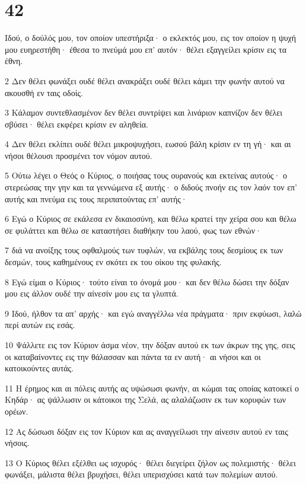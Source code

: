 \chapter{42}

\par Ιδού, ο δούλός μου, τον οποίον υπεστήριξα· ο εκλεκτός μου, εις τον οποίον η ψυχή μου ευηρεστήθη· έθεσα το πνεύμά μου επ' αυτόν· θέλει εξαγγείλει κρίσιν εις τα έθνη.
\par 2 Δεν θέλει φωνάξει ουδέ θέλει ανακράξει ουδέ θέλει κάμει την φωνήν αυτού να ακουσθή εν ταις οδοίς.
\par 3 Κάλαμον συντεθλασμένον δεν θέλει συντρίψει και λινάριον καπνίζον δεν θέλει σβύσει· θέλει εκφέρει κρίσιν εν αληθεία.
\par 4 Δεν θέλει εκλίπει ουδέ θέλει μικροψυχήσει, εωσού βάλη κρίσιν εν τη γή· και αι νήσοι θέλουσι προσμένει τον νόμον αυτού.
\par 5 Ούτω λέγει ο Θεός ο Κύριος, ο ποιήσας τους ουρανούς και εκτείνας αυτούς· ο στερεώσας την γην και τα γεννώμενα εξ αυτής· ο διδούς πνοήν εις τον λαόν τον επ' αυτής και πνεύμα εις τους περιπατούντας επ' αυτής·
\par 6 Εγώ ο Κύριος σε εκάλεσα εν δικαιοσύνη, και θέλω κρατεί την χείρα σου και θέλω σε φυλάττει και θέλω σε καταστήσει διαθήκην του λαού, φως των εθνών·
\par 7 διά να ανοίξης τους οφθαλμούς των τυφλών, να εκβάλης τους δεσμίους εκ των δεσμών, τους καθημένους εν σκότει εκ του οίκου της φυλακής.
\par 8 Εγώ είμαι ο Κύριος· τούτο είναι το όνομά μου· και δεν θέλω δώσει την δόξαν μου εις άλλον ουδέ την αίνεσίν μου εις τα γλυπτά.
\par 9 Ιδού, ήλθον τα απ' αρχής· και εγώ αναγγέλλω νέα πράγματα· πριν εκφύωσι, λαλώ περί αυτών εις εσάς.
\par 10 Ψάλλετε εις τον Κύριον άσμα νέον, την δόξαν αυτού εκ των άκρων της γης, σεις οι καταβαίνοντες εις την θάλασσαν και πάντα τα εν αυτή· αι νήσοι και οι κατοικούντες αυτάς.
\par 11 Η έρημος και αι πόλεις αυτής ας υψώσωσι φωνήν, αι κώμαι τας οποίας κατοικεί ο Κηδάρ· ας ψάλλωσιν οι κάτοικοι της Σελά, ας αλαλάζωσιν εκ των κορυφών των ορέων.
\par 12 Ας δώσωσι δόξαν εις τον Κύριον και ας αναγγείλωσι την αίνεσιν αυτού εν ταις νήσοις.
\par 13 Ο Κύριος θέλει εξέλθει ως ισχυρός· θέλει διεγείρει ζήλον ως πολεμιστής· θέλει φωνάξει, μάλιστα θέλει βρυχήσει, θέλει υπερισχύσει κατά των πολεμίων αυτού.
